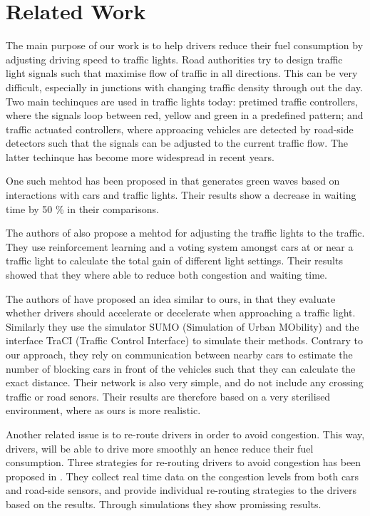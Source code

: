 \section{Related Work}

The main purpose of our work is to help drivers reduce their fuel consumption by adjusting driving speed to traffic lights.
Road authorities try to design traffic light signals such that maximise flow of traffic in all directions.
This can be very difficult, especially in junctions with changing traffic density through out the day.
Two main techinques are used in traffic lights today: pretimed traffic controllers, where the signals loop between red, yellow and green in a predefined pattern; and traffic actuated controllers, where approacing vehicles are detected by road-side detectors such that the signals can be adjusted to the current traffic flow.
The latter techinque has become more widespread in recent years. %



One such mehtod has been proposed in \cite{SOTL} that generates green waves based on interactions with cars and traffic lights. Their results show a decrease in waiting time by 50 \% in their comparisons.

The authors of \cite{ITLC} also propose a mehtod for adjusting the traffic lights to the traffic. They use reinforcement learning and a voting system amongst cars at or near a traffic light to calculate the total gain of different light settings. Their results showed that they where able to reduce both congestion and waiting time.

The authors of \cite{VANETsim} have proposed an idea similar to ours, in that they evaluate whether drivers should accelerate or decelerate when approaching a traffic light.
Similarly they use the simulator SUMO (Simulation of Urban MObility) and the interface TraCI (Traffic Control Interface) to simulate their methods. 
Contrary to our approach, they rely on communication between nearby cars to estimate the number of blocking cars in front of the vehicles such that they can calculate the exact distance.
Their network is also very simple, and do not include any crossing traffic or road senors. 
Their results are therefore based on a very sterilised environment, where as ours is more realistic.

Another related issue is to re-route drivers in order to avoid congestion. This way, drivers, will be able to drive more smoothly an hence reduce their fuel consumption. 
Three strategies for re-routing drivers to avoid congestion has been proposed in \cite{congestionAvoidance}. They collect real time data on the congestion levels from both cars and road-side sensors, and provide individual re-routing strategies to the drivers based on the results. Through simulations they show promissing results.

